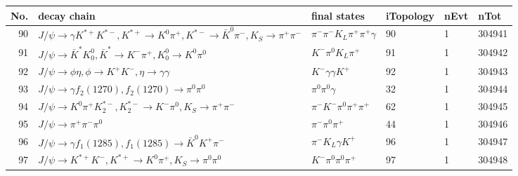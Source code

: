 \begin{table}[htbp] 
\begin{center}
\begin{small}
\begin{tabular}{rlllll}\hline\hline
 No. & decay chain & final states &  iTopology & nEvt & nTot \\\hline
 90&$J/\psi       \rightarrow \gamma       K^{*+}         K^{*-}         , K^{*+}          \rightarrow K^{0}          \pi^{+}        , K^{*-}          \rightarrow \bar{K}^{0}   \pi^{-}        , K_{S}           \rightarrow \pi^{+}        \pi^{-}        $&$\pi^{-}        \pi^{-}        K_{L}          \pi^{+}        \pi^{+}        \gamma       $&   90&    1&304941\\
 91&$J/\psi       \rightarrow \bar{K}^{*}   K_0^{0}        , \bar{K}^{*}    \rightarrow K^{-}          \pi^{+}        , K_0^{0}         \rightarrow K^{0}          \pi^{0}        $&$K^{-}          \pi^{0}        K_{L}          \pi^{+}        $&   91&    1&304942\\
 92&$J/\psi       \rightarrow \phi           \eta          , \phi            \rightarrow K^{+}          K^{-}          , \eta           \rightarrow \gamma       \gamma       $&$K^{-}          \gamma       \gamma       K^{+}          $&   92&    1&304943\\
 93&$J/\psi       \rightarrow \gamma       f_{2}(1270)    , f_{2}(1270)     \rightarrow \pi^{0}        \pi^{0}        $&$\pi^{0}        \pi^{0}        \gamma       $&   32&    1&304944\\
 94&$J/\psi       \rightarrow K^{0}          \pi^{+}        K_2^{*-}       , K_2^{*-}        \rightarrow K^{-}          \pi^{0}        , K_{S}           \rightarrow \pi^{+}        \pi^{-}        $&$\pi^{-}        K^{-}          \pi^{0}        \pi^{+}        \pi^{+}        $&   62&    1&304945\\
 95&$J/\psi       \rightarrow \pi^{+}        \pi^{-}        \pi^{0}        $&$\pi^{-}        \pi^{0}        \pi^{+}        $&   44&    1&304946\\
 96&$J/\psi       \rightarrow \gamma       f_{1}(1285)    , f_{1}(1285)     \rightarrow \bar{K}^{0}   K^{+}          \pi^{-}        $&$\pi^{-}        K_{L}          \gamma       K^{+}          $&   96&    1&304947\\
 97&$J/\psi       \rightarrow K^{*+}         K^{-}          , K^{*+}          \rightarrow K^{0}          \pi^{+}        , K_{S}           \rightarrow \pi^{0}        \pi^{0}        $&$K^{-}          \pi^{0}        \pi^{0}        \pi^{+}        $&   97&    1&304948\\

\end{tabular}
\end{small}
\end{center}
\end{table}
